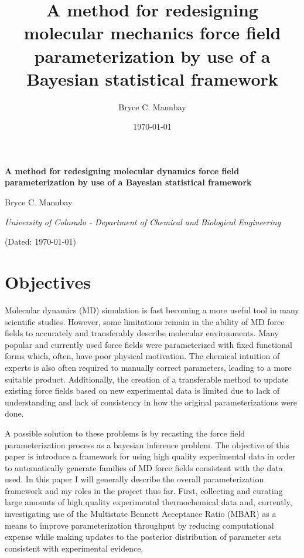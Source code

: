 \documentclass[rmp,nofootinbib,superscriptaddress,12pt,tightenlines,notitlepage]{revtex4-1}
\begin{document}

\title{A method for redesigning molecular mechanics force field parameterization by use of a Bayesian statistical framework\vspace{-2ex}}
\author{Bryce C. Manubay\vspace{-2ex}} 
\date{\today\vspace{-2ex}}

{\Large \textbf{A method for redesigning molecular dynamics force field parameterization by use of a Bayesian statistical framework}}

\hspace{0.5 in} Bryce C. Manubay

\hspace{0.5 in} \textit{University of Colorado - Department of Chemical and Biological Engineering}

\hspace{0.5 in} (Dated: \today) 

\section{Objectives}
Molecular dynamics (MD) simulation is fast becoming a more useful tool in many scientific studies. 
However, some limitations remain in the ability of MD force fields to accurately and transferably 
describe molecular environments. Many popular and currently used force fields were parameterized 
with fixed functional forms which, often, have poor physical motivation. The chemical intuition of 
experts is also often required to manually correct parameters, leading to a more suitable product. 
Additionally, the creation of a transferable method to update existing force fields based on new 
experimental data is limited due to lack of understanding and lack of consistency in how the original 
parameterizations were done.

A possible solution to these problems is by recasting the force field parameterization process as a 
bayesian inference problem. The objective of this paper is introduce a framework for using high quality 
experimental data in order to automatically generate families of MD force fields consistent with the data 
used. In this paper I will generally describe the overall parameterization framework and my roles in the project 
thus far. First, collecting and curating large amounts of high quality experimental thermochemical data 
and, currently, investigating use of the Multistate Bennett Acceptance Ratio (MBAR) as a means to improve 
parameterization throughput by reducing computational expense while making updates to the posterior distribution 
of parameter sets consistent with experimental evidence.
\end{document}
